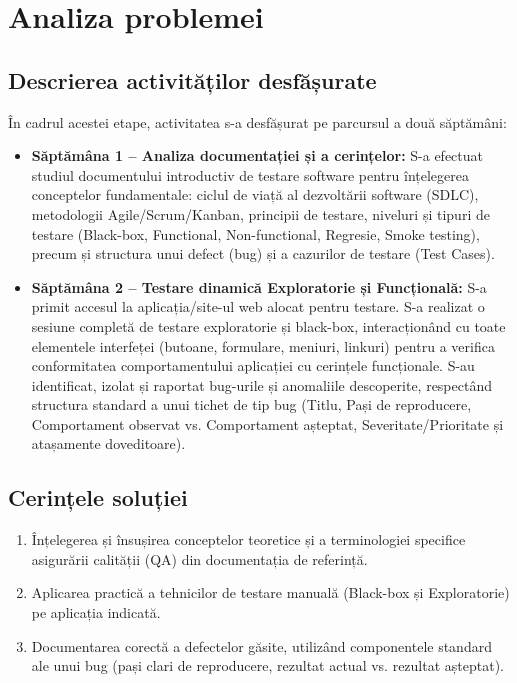\chapter{Analiza problemei}

\section{Descrierea activităților desfășurate}
În cadrul acestei etape, activitatea s-a desfășurat pe parcursul a două săptămâni:
\begin{itemize}
    \item \textbf{Săptămâna 1 -- Analiza documentației și a cerințelor:} S-a efectuat studiul documentului introductiv de testare software pentru înțelegerea conceptelor fundamentale: ciclul de viață al dezvoltării software (SDLC), metodologii Agile/Scrum/Kanban, principii de testare, niveluri și tipuri de testare (Black-box, Functional, Non-functional, Regresie, Smoke testing), precum și structura unui defect (bug) și a cazurilor de testare (Test Cases).
    \item \textbf{Săptămâna 2 -- Testare dinamică Exploratorie și Funcțională:} S-a primit accesul la aplicația/site-ul web alocat pentru testare. S-a realizat o sesiune completă de testare exploratorie și black-box, interacționând cu toate elementele interfeței (butoane, formulare, meniuri, linkuri) pentru a verifica conformitatea comportamentului aplicației cu cerințele funcționale. S-au identificat, izolat și raportat bug-urile și anomaliile descoperite, respectând structura standard a unui tichet de tip bug (Titlu, Pași de reproducere, Comportament observat vs. Comportament așteptat, Severitate/Prioritate și atașamente doveditoare).
\end{itemize}

\section{Cerințele soluției}
\begin{enumerate}
    \item Înțelegerea și însușirea conceptelor teoretice și a terminologiei specifice asigurării calității (QA) din documentația de referință.
    \item Aplicarea practică a tehnicilor de testare manuală (Black-box și Exploratorie) pe aplicația indicată.
    \item Documentarea corectă a defectelor găsite, utilizând componentele standard ale unui bug (pași clari de reproducere, rezultat actual vs. rezultat așteptat).
\end{enumerate}

